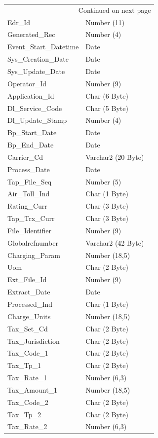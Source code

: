\documentclass[12pt,twoside]{article}
\begin{document}
\begin{longtable}{l|l|l}
\hline
\endhead
\hline\multicolumn{3}{r}{Continued on next page} \\
\endfoot
\endlastfoot
\hline
Edr\_Id & Number (11) & \\
Generated\_Rec & Number (4) & \\
Event\_Start\_Datetime & Date & \\
Sys\_Creation\_Date & Date & \\
Sys\_Update\_Date & Date & \\
Operator\_Id & Number (9) & \\
Application\_Id & Char (6 Byte) & \\
Dl\_Service\_Code & Char (5 Byte) & \\
Dl\_Update\_Stamp & Number (4) & \\
Bp\_Start\_Date & Date & \\
Bp\_End\_Date & Date & \\
Carrier\_Cd & Varchar2 (20 Byte) & \\
Process\_Date & Date & \\
Tap\_File\_Seq & Number (5) & \\
Air\_Toll\_Ind & Char (1 Byte) & \\
Rating\_Curr & Char (3 Byte) & \\
Tap\_Trx\_Curr & Char (3 Byte) & \\
File\_Identifier & Number (9) & \\
Globalrefnumber & Varchar2 (42 Byte) & \\
Charging\_Param & Number (18,5) & \\
Uom & Char (2 Byte) & \\
Ext\_File\_Id & Number (9) & \\
Extract\_Date & Date & \\
Processed\_Ind & Char (1 Byte) & \\
Charge\_Units & Number (18,5) & \\
Tax\_Set\_Cd & Char (2 Byte) & \\
Tax\_Jurisdiction & Char (2 Byte) & \\
Tax\_Code\_1 & Char (2 Byte) & \\
Tax\_Tp\_1 & Char (2 Byte) & \\
Tax\_Rate\_1 & Number (6,3) & \\
Tax\_Amount\_1 & Number (18,5) & \\
Tax\_Code\_2 & Char (2 Byte) & \\
Tax\_Tp\_2 & Char (2 Byte) & \\
Tax\_Rate\_2 & Number (6,3) & \\

\end{longtable}
\end{document}

